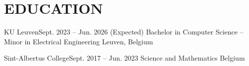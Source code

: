 \section{EDUCATION}

\resumeSubHeadingListStart

\resumeSubheading
{KU Leuven}{Sept. 2023 -- Jun. 2026 (Expected)}
{Bachelor in Computer Science -- Minor in Electrical Engineering}
{Leuven, Belgium}

\resumeSubheading
{Sint-Albertus College}{Sept. 2017 -- Jun. 2023}
{Science and Mathematics}
{Belgium}

\resumeSubHeadingListEnd
